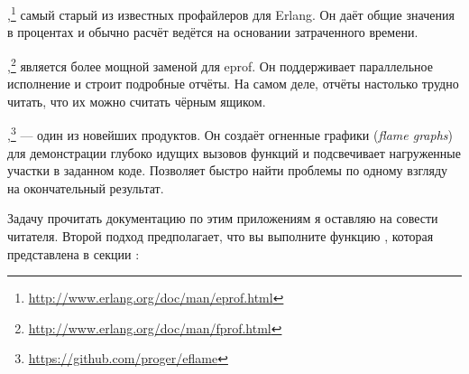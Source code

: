 \begin{itemize*}
	\item {},\footnote{\href{http://www.erlang.org/doc/man/eprof.html}{http://www.erlang.org/doc/man/eprof.html}} самый старый из известных профайлеров для Erlang. Он даёт общие значения в процентах и обычно расчёт ведётся на основании затраченного времени.
	\item {},\footnote{\href{http://www.erlang.org/doc/man/fprof.html}{http://www.erlang.org/doc/man/fprof.html}} является более мощной заменой для eprof. Он поддерживает параллельное исполнение и строит подробные отчёты. На самом деле, отчёты настолько трудно читать, что их можно считать чёрным ящиком.
	\item {},\footnote{\href{https://github.com/proger/eflame}{https://github.com/proger/eflame}} --- один из новейших продуктов. Он создаёт огненные графики (\emph{flame graphs}) для демонстрации глубоко идущих вызовов функций и подсвечивает нагруженные участки в заданном коде. Позволяет быстро найти проблемы по одному взгляду на окончательный результат.
\end{itemize*}

Задачу прочитать документацию по этим приложениям я оставляю на совести читателя. Второй подход предполагает, что вы выполните функцию , которая представлена в секции :


